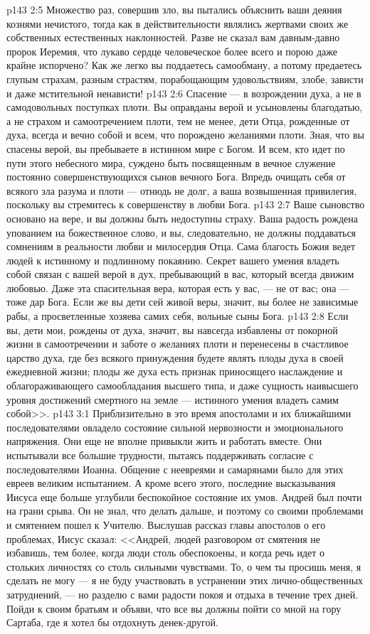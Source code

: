 \vs p143 2:5 Множество раз, совершив зло, вы пытались объяснить ваши деяния кознями нечистого, тогда как в действительности являлись жертвами своих же собственных естественных наклонностей. Разве не сказал вам давным\hyp{}давно пророк Иеремия, что лукаво сердце человеческое более всего и порою даже крайне испорчено? Как же легко вы поддаетесь самообману, а потому предаетесь глупым страхам, разным страстям, порабощающим удовольствиям, злобе, зависти и даже мстительной ненависти!
\vs p143 2:6 Спасение --- в возрождении духа, а не в самодовольных поступках плоти. Вы оправданы верой и усыновлены благодатью, а не страхом и самоотречением плоти, тем не менее, дети Отца, рожденные от духа, всегда и вечно  собой и всем, что порождено желаниями плоти. Зная, что вы спасены верой, вы пребываете в истинном мире с Богом. И всем, кто идет по пути этого небесного мира, суждено быть посвященным в вечное служение постоянно совершенствующихся сынов вечного Бога. Впредь очищать себя от всякого зла разума и плоти --- отнюдь не долг, а ваша возвышенная привилегия, поскольку вы стремитесь к совершенству в любви Бога.
\vs p143 2:7 Ваше сыновство основано на вере, и вы должны быть недоступны страху. Ваша радость рождена упованием на божественное слово, и вы, следовательно, не должны поддаваться сомнениям в реальности любви и милосердия Отца. Сама благость Божия ведет людей к истинному и подлинному покаянию. Секрет вашего умения владеть собой связан с вашей верой в дух, пребывающий в вас, который всегда движим любовью. Даже эта спасительная вера, которая есть у вас, --- не от вас; она --- тоже дар Бога. Если же вы дети сей живой веры, значит, вы более не зависимые рабы, а просветленные хозяева самих себя, вольные сыны Бога.
\vs p143 2:8 Если вы, дети мои, рождены от духа, значит, вы навсегда избавлены от покорной жизни в самоотречении и заботе о желаниях плоти и перенесены в счастливое царство духа, где без всякого принуждения будете являть плоды духа в своей ежедневной жизни; плоды же духа есть признак приносящего наслаждение и облагораживающего самообладания высшего типа, и даже сущность наивысшего уровня достижений смертного на земле --- истинного умения владеть самим собой>>.
\vs p143 3:1 Приблизительно в это время апостолами и их ближайшими последователями овладело состояние сильной нервозности и эмоционального напряжения. Они еще не вполне привыкли жить и работать вместе. Они испытывали все большие трудности, пытаясь поддерживать согласие с последователями Иоанна. Общение с неевреями и самарянами было для этих евреев великим испытанием. А кроме всего этого, последние высказывания Иисуса еще больше углубили беспокойное состояние их умов. Андрей был почти на грани срыва. Он не знал, что делать дальше, и поэтому со своими проблемами и смятением пошел к Учителю. Выслушав рассказ главы апостолов о его проблемах, Иисус сказал: <<Андрей, людей разговором от смятения не избавишь, тем более, когда люди столь обеспокоены, и когда речь идет о стольких личностях со столь сильными чувствами. То, о чем ты просишь меня, я сделать не могу --- я не буду участвовать в устранении этих лично\hyp{}общественных затруднений, --- но разделю с вами радости покоя и отдыха в течение трех дней. Пойди к своим братьям и объяви, что все вы должны пойти со мной на гору Сартаба, где я хотел бы отдохнуть денек\hyp{}другой.

